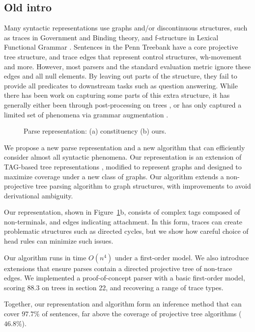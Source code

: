 \subsection{Old intro}

Many syntactic representations use graphs and/or discontinuous structures, such as traces in Government and Binding theory, and f-structure in Lexical Functional Grammar \parencite{gb,Bresnan:1982}.
Sentences in the Penn Treebank \parencite{ptb} have a core projective tree structure, and trace edges that represent control structures, wh-movement and more.
However, most parsers and the standard evaluation metric ignore these edges and all null elements.
By leaving out parts of the structure, they fail to provide all predicates to downstream tasks such as question answering.
While there has been work on capturing some parts of this extra structure, it has generally either been through post-processing on trees
\parencite{Johnson:2002,Jijkoun:2003,Campbell:2004,Levy:2004,Gabbard:2006},
or has only captured a limited set of phenomena via grammar augmentation
\parencite{collins:1997,dienes-dubey:2003,schmid:2006,cai-chiang-goldberg:2011}.

\begin{figure}
  \centering
  \scalebox{0.65}{
  
  }
  \vspace{-5mm}
  \caption{\label{fig:repr}
    Parse representation: (a) constituency (b) ours.
  }
\end{figure}

We propose a new parse representation and a new algorithm that can efficiently consider almost all syntactic phenomena.
Our representation is an extension of TAG-based tree representations \parencite{cck,Shen:2007}, modified to represent graphs and designed to maximize coverage under a new class of graphs.
Our algorithm extends a non-projective tree parsing algorithm \parencite{ec} to graph structures, with improvements to avoid derivational ambiguity.

Our representation, shown in Figure~\ref{fig:repr}b, consists of complex tags composed of non-terminals, and edges indicating attachment.
In this form, traces can create problematic structures such as directed cycles, but we show how careful choice of head rules can minimize such issues.

Our algorithm runs in time $O(n^4)$ under a first-order model.
We also introduce extensions that ensure parses contain a directed projective tree of non-trace edges.
We implemented a proof-of-concept parser with a basic first-order model, scoring $88.3$ on trees in section 22, and recovering a range of trace types.

Together, our representation and algorithm form an inference method that can cover $97.7\%$ of sentences, far above the coverage of projective tree algorithms ($46.8\%$).
